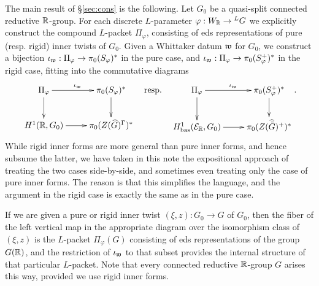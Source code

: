 \documentclass{article}
\theoremstyle{definition}
\numberwithin{equation}{section}
\renewcommand{\-}{\hyp{}}
\begin{document}
The main result of \S\ref{sec:cons} is the following. Let $G_0$ be a quasi-split connected reductive $\mathbb{R}$-group. For each discrete $L$-parameter $\varphi : W_{\mathbb{R}} \to {^LG}$ we explicitly construct the compound $L$-packet $\Pi_\varphi$, consisting of eds representations of pure (resp. rigid) inner twists of $G_0$. Given a Whittaker datum $\mathfrak{w}$ for $G_0$, we construct a bijection $\iota_{\mathfrak{w}} : \Pi_\varphi \to \pi_0(S_\varphi)^*$ in the pure case, and $\iota_{\mathfrak{w}} : \Pi_\varphi \to \pi_0(S_\varphi^+)^*$ in the rigid case, fitting into the commutative diagrams
\[ \xymatrix{
	\Pi_\varphi\ar[r]^{\iota_\mf{w}}\ar[d]&\pi_0(S_\varphi)^*\ar[d]\\
	H^1(\R,G_0)\ar[r]&\pi_0(Z(\hat G)^\Gamma)^*
}\quad\tx{resp.}\quad
\xymatrix{
	\Pi_\varphi\ar[r]^{\iota_\mf{w}}\ar[d]&\pi_0(S_\varphi^+)^*\ar[d]\\
	H^1_\tx{bas}(\mc{E}_\R,G_0)\ar[r]&\pi_0(Z(\hat{\bar G})^+)^*
}.
\]
While rigid inner forms are more general than pure inner forms, and hence subsume the latter, we have taken in this note the expositional approach of treating the two cases side-by-side, and sometimes even treating only the case of pure inner forms. The reason is that this simplifies the language, and the argument in the rigid case is exactly the same as in the pure case.

If we are given a pure or rigid inner twist $(\xi,z) : G_0 \to G$  of $G_0$, then the fiber of the left vertical map in the appropriate diagram over the isomorphism class of $(\xi,z)$ is the $L$-packet $\Pi_\varphi(G)$ consisting of eds representations of the group $G(\mathbb{R})$, and the restriction of $\iota_{\mathfrak{w}}$ to that subset provides the internal structure of that particular $L$-packet. Note that every connected reductive $\mathbb{R}$-group $G$ arises this way, provided we use rigid inner forms.
\end{document}
